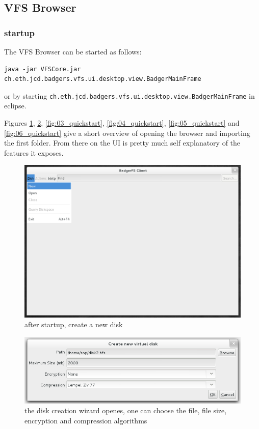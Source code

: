 \subsection{VFS Browser}
\subsubsection{startup}
The VFS Browser  can be started as follows:

\begin{verbatim}
java -jar VFSCore.jar ch.eth.jcd.badgers.vfs.ui.desktop.view.BadgerMainFrame
\end{verbatim}

or by starting \verb|ch.eth.jcd.badgers.vfs.ui.desktop.view.BadgerMainFrame| in eclipse.

Figures \ref{fig:01_quickstart}, \ref{fig:02_quickstart},
\ref{fig:03_quickstart}, \ref{fig:04_quickstart}, \ref{fig:05_quickstart} and
\ref{fig:06_quickstart} give a short overview of opening the browser and
importing the first folder. From there on the UI is pretty much self explanatory
of the features it exposes.

\begin{figure}[h!]
\centering
\includegraphics[width=1\textwidth]{figures/01_quickstart.png}
\caption{after startup, create a new disk}
\label{fig:01_quickstart}
\end{figure}

\begin{figure}[h!]
\centering
\includegraphics[width=1\textwidth]{figures/02_quickstart.png}
\caption{the disk creation wizard openes, one can choose the file, file size,
encryption and compression algorithms}
\label{fig:02_quickstart}
\end{figure}

